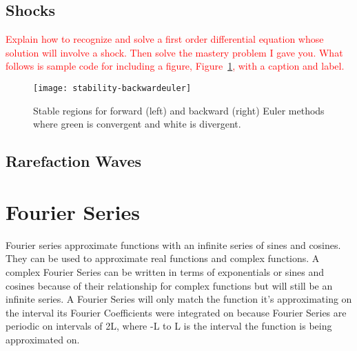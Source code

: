 \documentclass{article}
\newcommand{\red}[1]{\textcolor{red}{#1}}
\newcommand{\blue}[1]{\textcolor{blue}{#1}}
\begin{document}
\subsection{Shocks}
\red{Explain how to recognize and solve a first order differential equation whose solution will involve a shock. Then solve the mastery problem I gave you. What follows is sample code for including a figure, Figure~\ref{fig:example}, with a caption and label.}
\begin{figure}[ht]
\begin{center}
  \texttt{[image: stability-backwardeuler]}
  \end{center}
\caption{Stable regions for forward (left) and backward (right) Euler methods where green is
  convergent and white is divergent. \label{fig:example}}
\end{figure}
\subsection{Rarefaction Waves}

\section{Fourier Series}
Fourier series approximate functions with an infinite series of sines and cosines. They can be used to approximate real functions and complex functions. A complex Fourier Series can be written in terms of exponentials or sines and cosines because of their relationship for complex functions but will still be an infinite series. \newline
A Fourier Series will only match the function it's approximating on the interval its Fourier Coefficients were integrated on because Fourier Series are periodic on intervals of 2L, where -L to L is the interval the function is being approximated on. 
\end{document}
